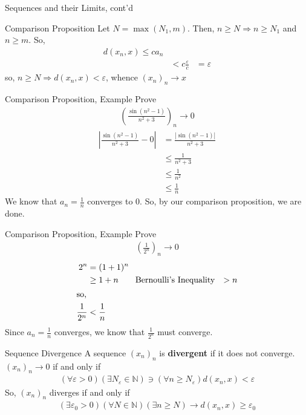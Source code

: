 \documentclass[10pt]{extarticle}
\newcommand{\N}{\mathbb{N}}
\begin{document}
\begin{problem}{Sequences and their Limits, cont'd}
\begin{problem}{Comparison Proposition}
      Let $N = \max(N_1,m)$. Then, $n \geq N\Rightarrow n\geq N_1$ and $n\geq m$. So,
      \begin{align*}
        d(x_n,x) \leq ca_n\\
        &< c\frac{\varepsilon}{c}
        &=\varepsilon
      \end{align*}
      so, $n\geq N \Rightarrow d(x_n,x) < \varepsilon$, whence $(x_n)_n \rightarrow x$
    \end{problem}
    \begin{problem}{Comparison Proposition, Example}
      Prove
      \begin{align*}
        \left(\frac{\sin(n^2-1)}{n^2 + 3}\right)_n \rightarrow 0
      \end{align*}
      \tcblower
      \begin{align*}
        \left|\frac{\sin(n^2 - 1)}{n^2 + 3} - 0\right| &= \frac{|\sin(n^2 - 1)|}{n^2 + 3}\\
                                                       &\leq \frac{1}{n^2 + 3}\\
                                                       &\leq \frac{1}{n^2}\\
                                                       &\leq \frac{1}{n}
      \end{align*}
      We know that $a_n = \frac{1}{n}$ converges to $0$. So, by our comparison proposition, we are done.
      \begin{problem}{Comparison Proposition, Example}
        Prove
        \begin{align*}
          \left(\frac{1}{2^n}\right)_n \rightarrow 0
        \end{align*}
        \tcblower
        \begin{align*}
          2^n &= (1+1)^n\\
              &\geq 1+n\tag*{Bernoulli's Inequality}
              &>n\\
              \shortintertext{so,}
          \frac{1}{2^n} &< \frac{1}{n}
        \end{align*}
        Since $a_n = \frac{1}{n}$ converges, we know that $\frac{1}{2^n}$ must converge.
      \end{problem}
    \end{problem}
  \end{problem}
  \begin{problem}{Sequence Divergence}
    A sequence $(x_n)_n$ is \textbf{divergent} if it does not converge. $(x_n)_n \rightarrow 0$ if and only if
    \begin{align*}
      (\forall \varepsilon > 0)(\exists N_{\varepsilon} \in \N) \ni (\forall n\geq N_{\varepsilon}) d(x_n,x) < \varepsilon
    \end{align*}
    So, $(x_n)_n$ diverges if and only if
    \begin{align*}
      (\exists \varepsilon_0 > 0)(\forall N\in\N) (\exists n\geq N) \rightarrow d(x_n,x)\geq \varepsilon_0
    \end{align*}
  \end{problem}
\end{document}
